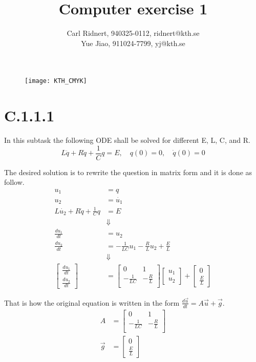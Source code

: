 \documentclass[11pt,a4paper,roman]{scrartcl}
\title{Computer exercise 1}
\date{}
\author{Carl Ridnert, 940325-0112, ridnert@kth.se \\
Yue Jiao, 911024-7799, yj@kth.se}
\begin{document}
\maketitle
\begin{figure}[h]
\centering
\texttt{[image: KTH\_CMYK]}
\end{figure}
\newpage
\section*{C.1.1.1}
In this subtask the following ODE shall be solved for different E, L, C, and R. 
\begin{equation}
L\ddot{q}+R\dot{q}+\frac{1}{C}q = E,\quad q(0)=0,\quad \dot{q}(0) = 0
\end{equation}

The desired solution is to rewrite the question in matrix form and it is done as follow. 
\begin{equation} \begin{aligned}
u_1 & = q \\ u_2 & = \dot{u_1} \\ L\dot{u_2} + R\dot{q}+\frac{1}{C}q & = E \\ 
& \Downarrow \\ \frac{du_1}{dt} & = u_2 \\
\frac{du_2}{dt} & = -\frac{1}{LC}u_1-\frac{R}{L}u_2+\frac{E}{L} \\ & \Downarrow \\
\begin{bmatrix} \frac{du_1}{dt} \\ \frac{du_2}{dt} \end{bmatrix} & = 
\begin{bmatrix} 0 & 1 \\ -\frac{1}{LC} & -\frac{R}{L} \\ \end{bmatrix} 
\begin{bmatrix} u_1 \\ u_2 \end{bmatrix} +
\begin{bmatrix} 0 \\ \frac{E}{L} \end{bmatrix} 
\end{aligned} \end{equation}

That is how the original equation is written in the form $\frac{d\vec{u}}{dt}=A\vec{u}+\vec{g}$. 
\begin{equation}
\begin{aligned}
A & = \begin{bmatrix} 0 & 1 \\ -\frac{1}{LC} & -\frac{R}{L} \\ \end{bmatrix} \\
\vec{g} & = \begin{bmatrix} 0 \\ \frac{E}{L} \end{bmatrix} 
\end{aligned}
\end{equation}
\end{document}
